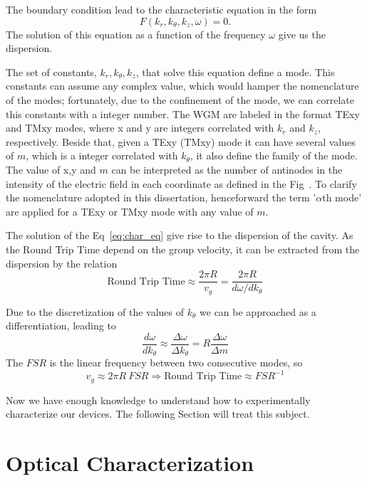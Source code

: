 The boundary condition lead to the characteristic equation in the form 
\begin{equation}
    F(k_r,k_\theta,k_z,\omega) = 0.
    \label{eq:char_eq}
\end{equation}
The solution of this equation as a function of the frequency $\omega$ give us the dispersion. 

The set of constants, $k_r,k_\theta,k_z$, that solve this equation define a mode. This constants can assume any complex value, which would hamper the nomenclature of the modes; fortunately, due to the confinement of the mode, we can correlate this constants with a integer number. The WGM are labeled in the format TExy and TMxy modes, where x and y are integers correlated with $k_r$ and $k_z$, respectively. Beside that, given a TExy (TMxy) mode it can have several values of $m$, which is a integer correlated with $k_\theta$, it also define the family of the mode. The value of x,y and $m$ can be interpreted as the number of antinodes in the intensity of the electric field in each coordinate as defined in the Fig~. To clarify the nomenclature adopted in this dissertation, henceforward the term '$\alpha$th mode' are applied for a TExy or TMxy mode with any value of $m$. 

The solution of the Eq~\ref{eq:char_eq} give rise to the dispersion of the cavity. As the Round Trip Time depend on the group velocity, it can be extracted from the dispersion by the relation
\begin{equation}
    \text{Round Trip Time} \approx \frac{2\pi R}{v_g} = \frac{2\pi R}{d\omega/dk_\theta} 
\end{equation}

Due to the discretization of the values of $k_\theta$ we can be approached as a differentiation, leading to
\begin{equation}
    \frac{d\omega}{dk_\theta} \approx \frac{\Delta \omega}{\Delta k_\theta} = R\frac{\Delta \omega}{\Delta m}
\end{equation}
The $FSR$ is the linear frequency between two consecutive modes, so
\begin{equation}
    v_g \approx 2\pi R~FSR \Rightarrow \text{Round Trip Time} \approx FSR^{-1} 
\end{equation}

Now we have enough knowledge to understand how to experimentally characterize our devices. The following Section will treat this subject. 

\section{Optical Characterization}
\label{sec:optical_char}

